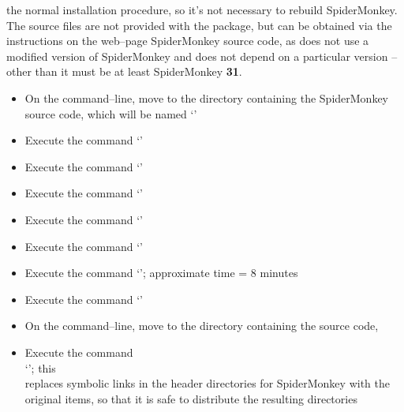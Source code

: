 the normal \mplusm{} installation procedure, so it's not necessary to rebuild
SpiderMonkey.
The source files are not provided with the  package, but can be obtained
via the instructions on the web--page
%
{SpiderMonkey source code}, as \mplusm{} does not use a modified version of SpiderMonkey
and does not depend on a particular version -- other than it must be at least SpiderMonkey
\textbf{31}.
\begin{itemize}
\item On the command--line, move to the directory containing the SpiderMonkey source code,
which will be named `'
\item Execute the command `'
\item Execute the command `'
\item Execute the command `'
\item Execute the command `'
\item Execute the command `'
\item Execute the command `'; approximate time = 8 minutes
\item Execute the command `'
\item On the command--line, move to the directory containing the \mplusm{} source code,
\item Execute the command\\
`';
this\\
replaces symbolic links in the header directories for SpiderMonkey with the original
items, so that it is safe to distribute the resulting directories
\end{itemize}
\tertiaryEnd{}
\TBD{}
\tertiaryEnd{}
\TBD{}
\tertiaryEnd{}
\secondaryEnd{}
